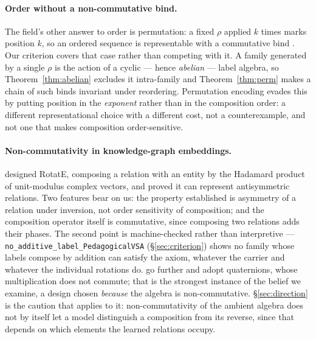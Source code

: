 \documentclass[10pt]{article}
\begin{document}
\paragraph{Order without a non-commutative bind.} The field's other answer to order is permutation: a fixed $\rho$ applied $k$ times marks position $k$, so an ordered sequence is representable with a commutative bind \citep{kanerva1996binary,kleyko2022survey}. Our criterion covers that case rather than competing with it. A family generated by a single $\rho$ is the action of a cyclic --- hence \emph{abelian} --- label algebra, so Theorem~\ref{thm:abelian} excludes it intra-family and Theorem~\ref{thm:perm} makes a chain of such binds invariant under reordering. Permutation encoding evades this by putting position in the \emph{exponent} rather than in the composition order: a different representational choice with a different cost, not a counterexample, and not one that makes composition order-sensitive.

\paragraph{Non-commutativity in knowledge-graph embeddings.} \citet{sun2019rotate} designed RotatE, composing a relation with an entity by the Hadamard product of unit-modulus complex vectors, and proved it can represent antisymmetric relations. Two features bear on us: the property established is asymmetry of a relation under inversion, not order sensitivity of composition; and the composition operator itself is commutative, since composing two relations adds their phases. The second point is machine-checked rather than interpretive --- \texttt{no\_additive\_label\_PedagogicalVSA} (\S\ref{sec:criterion}) shows no family whose labels compose by addition can satisfy the axiom, whatever the carrier and whatever the individual rotations do. \citet{zhang2019quate} go further and adopt quaternions, whose multiplication does not commute; that is the strongest instance of the belief we examine, a design chosen \emph{because} the algebra is non-commutative. \S\ref{sec:direction} is the caution that applies to it: non-commutativity of the ambient algebra does not by itself let a model distinguish a composition from its reverse, since that depends on which elements the learned relations occupy.
\end{document}
